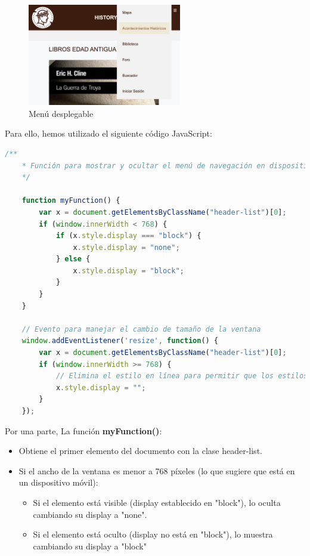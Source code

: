 \documentclass{article}
\begin{document}
\begin{figure}[H]
    \centering
    \includegraphics[width=0.6\textwidth]{jsFotos/headerJSFnct.jpg}
    \caption{Menú desplegable}
    \label{fig:foro_interface}
\end{figure}

\newpage

Para ello, hemos utilizado el siguiente código JavaScript:

\begin{lstlisting}[language=JavaScript, caption=Código de Header.js]
    /**
    * Función para mostrar y ocultar el menú de navegación en dispositivos móviles
    */

    function myFunction() {
        var x = document.getElementsByClassName("header-list")[0];
        if (window.innerWidth < 768) {
            if (x.style.display === "block") {
                x.style.display = "none";
            } else {
                x.style.display = "block";
            }
        }
    }

    // Evento para manejar el cambio de tamaño de la ventana
    window.addEventListener('resize', function() {
        var x = document.getElementsByClassName("header-list")[0];
        if (window.innerWidth >= 768) {
            // Elimina el estilo en línea para permitir que los estilos CSS se apliquen
            x.style.display = "";
        }
    });
\end{lstlisting}

Por una parte, La función \textbf{myFunction()}:
\begin{itemize}
    \item Obtiene el primer elemento del documento con la clase header-list.
    \item Si el ancho de la ventana es menor a 768 píxeles (lo que sugiere que está en un dispositivo móvil):
    \begin{itemize}
        \item Si el elemento está visible (display establecido en "block"), lo oculta cambiando su display a "none".
        \item Si el elemento está oculto (display no está en "block"), lo muestra cambiando su display a "block"
    \end{itemize}
\end{itemize}
\end{document}
